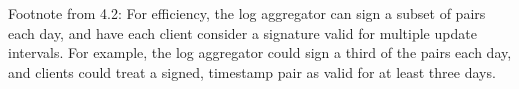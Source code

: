 
Footnote from 4.2: For efficiency, the log aggregator can sign a subset of pairs
each day, and have each client consider a signature valid for multiple update
intervals. For example, the log aggregator could sign a third of the pairs each
day, and clients could treat a signed, timestamp pair as valid for at least
three days.
